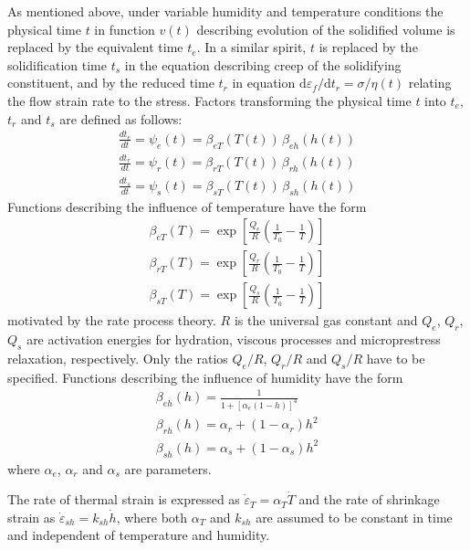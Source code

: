 \documentclass[a4paper]{article}
\begin{document}
As mentioned above, under variable humidity and temperature conditions the physical time $t$ in function $v(t)$ describing evolution of the solidified volume is replaced by the equivalent time $t_e$. In a similar spirit, $t$ is replaced by the solidification time $t_s$ in the equation describing creep of the solidifying constituent, and by the reduced time $t_r$ in equation $\mbox{d} \varepsilon_f / \mbox{d} t_r = \sigma / \eta(t)$ relating the flow strain rate to the stress.
Factors transforming the physical time $t$ into $t_e$, $t_r$ and $t_s$ are defined as follows:
\begin{eqnarray}
\label{dtedt}
 \frac{dt_e}{dt} = \psi_e(t) = \beta_{eT}(T(t))\, \beta_{eh}(h(t))\\
 \frac{dt_r}{dt} = \psi_r(t) = \beta_{rT}(T(t))\, \beta_{rh}(h(t))\\
 \frac{dt_s}{dt} = \psi_s(t) = \beta_{sT}(T(t))\, \beta_{sh}(h(t))
\end{eqnarray}
Functions describing the influence of temperature have the form 
\begin{eqnarray}
 \beta_{eT}(T) = \exp \left[ \frac{Q_e}{R}\left( \frac{1}{T_0} - \frac{1}{T} \right) \right]\\
 \beta_{rT}(T) = \exp \left[ \frac{Q_r}{R}\left( \frac{1}{T_0} - \frac{1}{T} \right) \right]\\
 \beta_{sT}(T) = \exp \left[ \frac{Q_s}{R}\left( \frac{1}{T_0} - \frac{1}{T} \right) \right]
\end{eqnarray}
motivated by the rate process theory.
$R$ is the universal gas constant and $Q_e$, $Q_r$, $Q_s$ are activation energies for hydration, viscous processes and microprestress relaxation, respectively.
Only the ratios $Q_e/R$, $Q_r/R$ and $Q_s/R$ have to be specified.
Functions describing the influence of humidity have the form 
\begin{eqnarray}
 \beta_{eh}(h) = \frac{1}{1+\left[\alpha_e \left( 1-h\right) \right]^4}\\
 \beta_{rh}(h) = \alpha_r + \left( 1 - \alpha_r \right) h^2\\
 \beta_{sh}(h) = \alpha_s + \left( 1 - \alpha_s \right) h^2
\end{eqnarray}
where $\alpha_e$, $\alpha_r$ and $\alpha_s$ are parameters. 

The rate of thermal strain is expressed as $\dot{\varepsilon}_T = \alpha_T \dot{T}$ and the rate of shrinkage strain as $\dot{\varepsilon}_{sh} = k_{sh} \dot{h}$, where both $\alpha_T$ and $k_{sh}$ are assumed to be constant in time and independent of temperature and humidity. 
\end{document}
